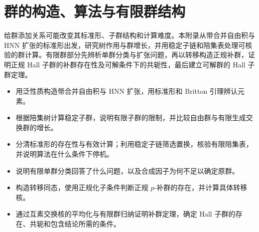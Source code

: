 
\chapter{群的构造、算法与有限群结构}
\label{b1:app:C}

\begin{chapterabstract}
	给群添加关系可能改变其标准形、子群结构和计算难度。本附录从带合并自由积与 HNN 扩张的标准形出发，研究树作用与群增长，并用稳定子链和陪集表处理可核验的群计算。有限群部分先辨析单群分类与扩张问题，再以转移构造正规补群，证明正规 Hall 子群的补群存在性及可解条件下的共轭性，最后建立可解群的 Hall 子群定理。
\end{chapterabstract}

\begin{learninggoals}
	\begin{itemize}
		\item 用泛性质构造带合并自由积与 HNN 扩张，用标准形和 Britton 引理辨认元素。
		\item 根据陪集树计算稳定子群，说明有限子群的限制，并比较自由群与有限生成交换群的增长。
		\item 分清标准形的存在性与有效计算；利用稳定子链筛选置换，核验有限陪集表，并说明算法在什么条件下停机。
		\item 说明有限单群分类回答了什么问题，以及合成因子为何不足以确定原群。
		\item 构造转移同态，使用正规化子条件判断正规 \(p\)-补群的存在，并计算具体转移核。
		\item 通过互素交换核的平均化与有限群归纳证明补群定理，确定 Hall 子群的存在、共轭和包含结论所需的条件。
	\end{itemize}

\end{learninggoals}

